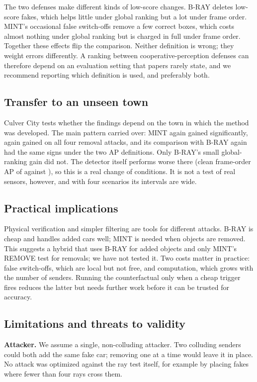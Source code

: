 \documentclass[conference]{IEEEtran}
\newcommand{\mint}{MINT}
\begin{document}
The two defenses make different kinds of low-score changes. B-RAY deletes low-score fakes, which helps little
under global ranking but a lot under frame order. \mint's occasional false switch-offs remove a few correct
boxes, which costs almost nothing under global ranking but is charged in full under frame order. Together these
effects flip the comparison. Neither definition is wrong; they weight errors differently. A ranking between
cooperative-perception defenses can therefore depend on an evaluation setting that papers rarely state, and we
recommend reporting which definition is used, and preferably both.

\subsection{Transfer to an unseen town}
Culver City tests whether the findings depend on the town in which the method was developed. The main pattern
carried over: \mint{} again gained significantly, again gained on all four removal attacks, and its comparison with
B-RAY again had the same signs under the two AP definitions. Only B-RAY's small global-ranking gain did not. The
detector itself performs worse there (clean frame-order AP of \CulAPCleanFrame{} against \APCleanFrame), so this is
a real change of conditions. It is not a test of real sensors, however, and with four scenarios its intervals are
wide.

\subsection{Practical implications}
Physical verification and simpler filtering are tools for different attacks. B-RAY is cheap and handles added
cars well; \mint{} is needed when objects are removed. This suggests a hybrid that uses B-RAY for added objects and
only \mint's REMOVE test for removals; we have not tested it. Two costs matter in practice: false switch-offs,
which are local but not free, and computation, which grows with the number of senders. Running the counterfactual
only when a cheap trigger fires reduces the latter but needs further work before it can be trusted for accuracy.

\subsection{Limitations and threats to validity}
\textbf{Attacker.} We assume a single, non-colluding attacker. Two colluding senders could both add the same fake
car; removing one at a time would leave it in place. No attack was optimized against the ray test itself, for
example by placing fakes where fewer than four rays cross them.
\end{document}
